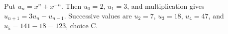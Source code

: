 Put $u_n=x^n+x^{-n}$. Then $u_0=2$, $u_1=3$, and multiplication gives $u_{n+1}=3u_n-u_{n-1}$. Successive values are $u_2=7$, $u_3=18$, $u_4=47$, and $u_5=141-18=\boxed{123}$, choice C.
